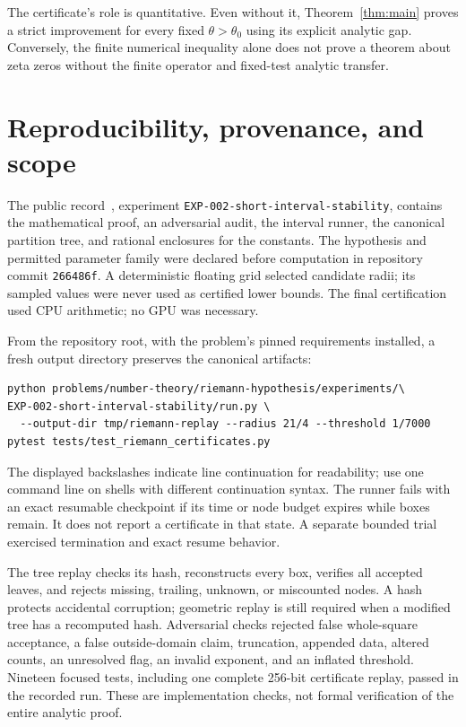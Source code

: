 \documentclass[11pt]{article}
\theoremstyle{remark}
\begin{document}
The certificate's role is quantitative. Even without it,
Theorem~\ref{thm:main} proves a strict improvement for every fixed
$\theta>\theta_0$ using its explicit analytic gap. Conversely, the
finite numerical inequality alone does not prove a theorem about zeta
zeros without the finite operator and fixed-test analytic transfer.

\appendix
\section{Reproducibility, provenance, and scope}

The public record~\cite{Record}, experiment
\texttt{EXP-002-short-interval-stability}, contains the mathematical proof,
an adversarial audit, the interval runner, the canonical partition tree,
and rational enclosures for the constants. The hypothesis and permitted
parameter family were declared before computation in repository commit
\texttt{266486f}. A
deterministic floating grid selected candidate radii; its sampled values
were never used as certified lower bounds. The final certification used
CPU arithmetic; no GPU was necessary.

From the repository root, with the problem's pinned requirements installed,
a fresh output directory preserves the canonical artifacts:
\begin{verbatim}
python problems/number-theory/riemann-hypothesis/experiments/\
EXP-002-short-interval-stability/run.py \
  --output-dir tmp/riemann-replay --radius 21/4 --threshold 1/7000
pytest tests/test_riemann_certificates.py
\end{verbatim}
The displayed backslashes indicate line continuation for readability;
use one command line on shells with different continuation syntax.
The runner fails with an exact resumable checkpoint if its time or node
budget expires while boxes remain. It does not report a certificate in
that state. A separate bounded trial exercised termination and exact
resume behavior.

The tree replay checks its hash, reconstructs every box, verifies all
accepted leaves, and rejects missing, trailing, unknown, or miscounted
nodes. A hash protects accidental corruption; geometric replay is still
required when a modified tree has a recomputed hash. Adversarial checks
rejected false whole-square acceptance, a false outside-domain claim,
truncation, appended data, altered counts, an unresolved flag, an invalid
exponent, and an inflated threshold. Nineteen focused tests, including
one complete 256-bit certificate replay, passed in the recorded run.
These are implementation checks, not formal verification of the entire
analytic proof.
\end{document}
